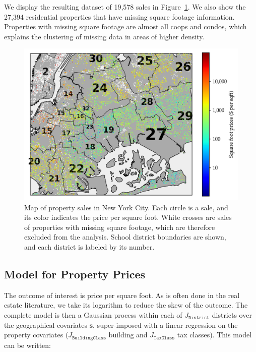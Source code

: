 \documentclass[letter]{article}
\makeatletter
\def\maxwidth{\ifdim\Gin@nat@width>\linewidth\linewidth
\else\Gin@nat@width\fi}
\let\Oldincludegraphics\includegraphics
\renewcommand{\includegraphics}[1]{\Oldincludegraphics[width=0.9\maxwidth]{#1}}
\newcommand{\tax}{\mathtt{TaxClass}}
\newcommand{\building}{\mathtt{BuildingClass}}
\newcommand{\district}{\mathtt{District}}
\newcommand{\svec}{\mathbold{s}}
\makeatother
\begin{document}
We display the resulting dataset of 19,578 sales in Figure~\ref{fig:sales_map}.
We also show the 27,394 residential properties that have missing square footage information.
Properties with missing square footage are almost all coops and condos, which explains the clustering of missing data in areas of higher density.
    


    	\begin{figure}
\centering
\includegraphics{../NYC/NYC_plots/NYC_sales_3.png}
\caption{\label{fig:sales_map}Map of property sales in New York City. Each circle is a sale, and its color indicates the price per square foot. White crosses are sales of properties with missing square footage, which are therefore excluded from the analysis. School district boundaries are shown, and each district is labeled by its number.}
\end{figure}
    


    	\subsection{Model for Property Prices}\label{model-for-property-prices}

The outcome of interest is price per square foot.
As is often done in the real estate literature, we take its logarithm to reduce the skew of the outcome.
The complete model is then a Gaussian process within each of \(J_\district\) districts over the geographical covariates \(\svec\), super-imposed with a linear regression on the property covariates (\(J_\building\) building and \(J_\tax\) tax classes).
This model can be written:
\end{document}
